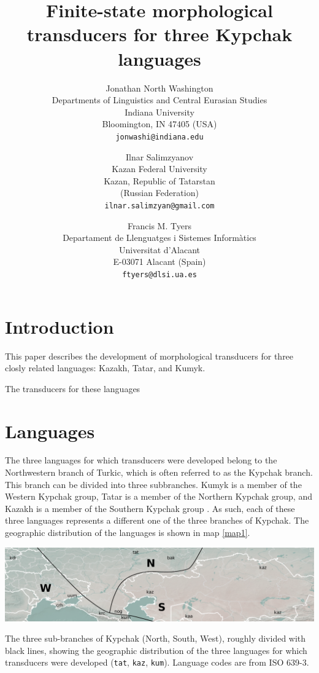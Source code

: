 \documentclass[a4paper,11pt,twocolumn]{article}
\title{Finite-state morphological transducers for three Kypchak languages}
\author{Jonathan North Washington \\
Departments of Linguistics and Central Eurasian Studies\\
Indiana University\\
Bloomington, IN 47405 (USA)\\
\texttt{jonwashi@indiana.edu} \and
Ilnar Salimzyanov  \\
Kazan Federal University \\
Kazan, Republic of Tatarstan\\
(Russian Federation) \\
\texttt{ilnar.salimzyan@gmail.com} \and 
Francis M. Tyers\\
Departament de Llenguatges i Sistemes Informàtics \\  
Universitat d'Alacant\\
E-03071 Alacant (Spain)\\
\texttt{ftyers@dlsi.ua.es} 
}
\begin{document}
\maketitleabstract{}

\section{Introduction}

This paper describes the development of morphological transducers for three closly related languages: Kazakh, Tatar, and Kumyk.


The transducers for these languages 


\section{Languages}

The three languages for which transducers were developed belong to the Northwestern branch of Turkic, which is often referred to as the Kypchak branch.  This branch can be divided into three subbranches.  Kumyk is a member of the Western Kypchak group, Tatar is a member of the Northern Kypchak group, and Kazakh is a member of the Southern Kypchak group \citep[82-83]{histofturkic}.  As such, each of these three languages represents a different one of the three branches of Kypchak.  The geographic distribution of the languages is shown in map \ref{map1}.

\begin{map*}[htbp]
	\includegraphics[width=\textwidth]{map/map}
	\caption{The three sub-branches of Kypchak (North, South, West), roughly divided with black lines, showing the geographic distribution of the three languages for which transducers were developed (\texttt{tat}, \texttt{kaz}, \texttt{kum}).  Language codes are from ISO 639-3.}
	\label{map1}
\end{map*}
\end{document}
